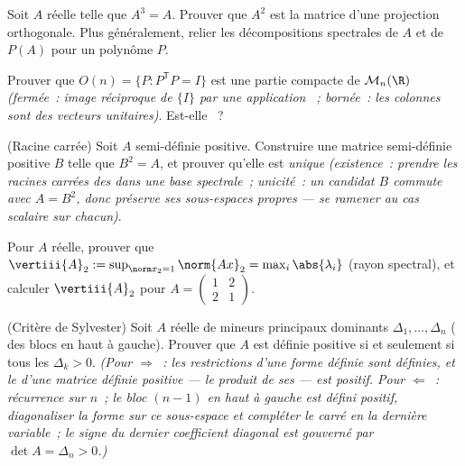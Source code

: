 \begin{exercise}[$\star\star$]\label{exo:b2:quadratic:4}
Soit $A$  réelle telle que $A^3 = A$. Prouver que $A^2$
est la matrice d'une projection orthogonale. Plus généralement,
relier les décompositions spectrales de $A$ et de $P(A)$ pour un
polynôme $P$.
\end{exercise}

\begin{exercise}[$\star\star$]\label{exo:b2:quadratic:5}
Prouver que $O(n) = \{P : P^{\mathsf T}P = I\}$ est une partie
compacte de $\mathcal{M}_n(\R)$ \emph{(fermée~: image réciproque de
$\{I\}$ par une application ~; bornée~: les colonnes sont
des vecteurs unitaires)}. Est-elle ~?
\end{exercise}

\begin{exercise}[$\star\star$]\label{exo:b2:quadratic:6}
(Racine carrée) Soit $A$  semi-définie positive.
Construire une matrice  semi-définie positive $B$ telle
que $B^2 = A$, et prouver qu'elle est \emph{unique} \emph{(existence~:
prendre les racines carrées des  dans une base
spectrale~; unicité~: un candidat $B$ commute avec $A = B^2$, donc
préserve ses sous-espaces propres --- se ramener au cas scalaire sur
chacun)}.
\end{exercise}

\begin{exercise}[$\star\star$]\label{exo:b2:quadratic:7}
Pour $A$  réelle, prouver que $\vertiii{A}_2 :=
\sup_{\norm x_2 = 1}\norm{Ax}_2 = \max_i \abs{\lambda_i}$
(rayon spectral), et calculer $\vertiii{A}_2$ pour $A =
\begin{pmatrix} 1 & 2\\ 2 & 1\end{pmatrix}$.
\end{exercise}

\begin{exercise}[$\star\star\star$]\label{exo:b2:quadratic:8}
(Critère de Sylvester) Soit $A$  réelle de mineurs
principaux dominants $\Delta_1, \dots, \Delta_n$ ( des
blocs en haut à gauche). Prouver que $A$ est définie positive si et
seulement si tous les $\Delta_k > 0$. \emph{(Pour $\Rightarrow$~: les
restrictions d'une forme définie sont définies, et le 
d'une matrice définie positive --- le produit de ses 
--- est positif. Pour $\Leftarrow$~: récurrence sur $n$~; le bloc
$(n-1)$ en haut à gauche est défini positif, diagonaliser la forme
sur ce sous-espace et compléter le carré en la dernière variable~;
le signe du dernier coefficient diagonal est gouverné par $\det A =
\Delta_n > 0$.)}
\end{exercise}

